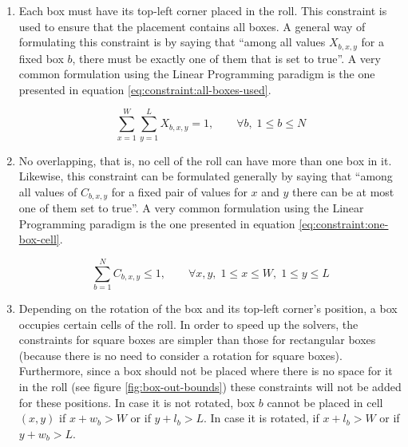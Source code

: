 \begin{enumerate}
    \item \label{constr:box-placed} Each box must have its top-left corner placed in the
    roll. This constraint is used to ensure that the placement contains all boxes.
	A general way of formulating this constraint is by saying that ``among all values $X_{b,x,y}$
	for a fixed box $b$, there must be exactly one of them that is set to true''.
	A very common formulation using the Linear Programming paradigm is the one presented
	in equation \ref{eq:constraint:all-boxes-used}.
	
    \begin{equation}
    \label{eq:constraint:all-boxes-used}
    \sum_{x=1}^{W} \sum_{y=1}^{L} X_{b,x,y} = 1, \qquad \forall b,\; 1 \le b \le N
    \end{equation}
    
    \item \label{constr:no-overlap} No overlapping, that is, no cell of the roll can have
    more than one box in it. Likewise, this constraint can be formulated generally by saying
    that ``among all values of $C_{b,x,y}$ for a fixed pair of values for $x$ and $y$ there
    can be at most one of them set to true''. A very common formulation using the Linear
    Programming paradigm is the one presented in equation \ref{eq:constraint:one-box-cell}.
    
    \begin{equation}
    \label{eq:constraint:one-box-cell}
    \sum_{b=1}^{N} C_{b,x,y} \le 1, \qquad \forall x,y,\; 1 \le x \le W,\; 1 \le y \le L
    \end{equation}
    
    \item \label{constr:box-rot-span} Depending on the rotation of the box and its top-left
    corner's position, a box occupies certain cells of the roll. In order to speed up the
    solvers, the constraints for square boxes are simpler than those for rectangular boxes
    (because there is no need to consider a rotation for square boxes). Furthermore, since
    a box should not be placed where there is no space for it in the roll (see figure
    \ref{fig:box-out-bounds}) these constraints will not be added for these positions.
    In case it is not rotated, box $b$ cannot be placed in cell $(x,y)$ if $x + w_b > W$ or
    if $y + l_b > L$. In case it is rotated, if $x + l_b > W$ or if $y + w_b > L$.
    

\end{enumerate}
